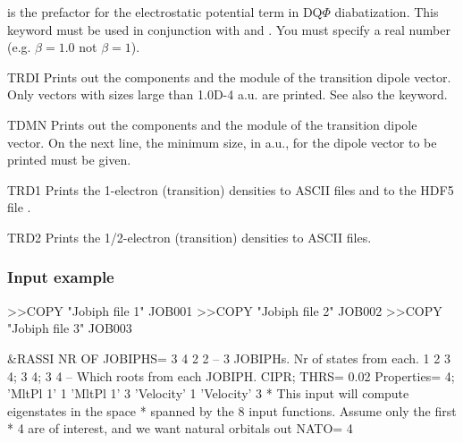 \begin{keywordlist}
 is the prefactor for the electrostatic potential term in DQ$\Phi$ diabatization.  This
keyword must be used in conjunction with  and .  You must
specify a real number (e.g. $\beta = 1.0$ not $\beta = 1$).
\item[TRDI]
Prints out the components and the module of the transition dipole
vector.  Only vectors with sizes large than 1.0D-4 a.u. are printed.
See also the  keyword.
\item[TDMN]
Prints out the components and the module of the transition dipole
vector. On the next line, the minimum size, in a.u., for the dipole
vector to be printed must be given.
\item[TRD1]
Prints the 1-electron (transition) densities to ASCII files and to
the HDF5 file .
\item[TRD2]
Prints the 1/2-electron (transition) densities to ASCII files.

\end{keywordlist}


\subsubsection{Input example}
>>COPY  "Jobiph file 1" JOB001
>>COPY  "Jobiph file 2" JOB002
>>COPY  "Jobiph file 3" JOB003
\begin{inputlisting}
 &RASSI
NR OF JOBIPHS= 3 4 2 2    -- 3 JOBIPHs. Nr of states from each.
1 2 3 4; 3 4; 3 4         -- Which roots from each JOBIPH.
CIPR; THRS= 0.02
Properties= 4; 'MltPl  1'  1   'MltPl  1'  3    'Velocity'  1 'Velocity'  3
* This input will compute eigenstates in the space
* spanned by the 8 input functions. Assume only the first
* 4 are of interest, and we want natural orbitals out
NATO= 4
\end{inputlisting}
